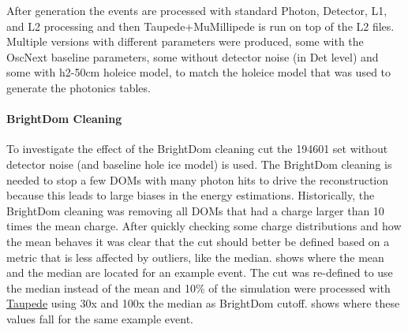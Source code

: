 After generation the events are processed with standard Photon, Detector, L1, and L2 processing and then Taupede+MuMillipede is run on top of the L2 files. Multiple versions with different parameters were produced, some with the OscNext baseline parameters, some without detector noise (in Det level) and some with h2-50cm holeice model, to match the holeice model that was used to generate the photonics tables.


\paragraph{BrightDom Cleaning}

To investigate the effect of the BrightDom cleaning cut the 194601 set without detector noise (and baseline hole ice model) is used. The BrightDom cleaning is needed to stop a few DOMs with many photon hits to drive the reconstruction because this leads to large biases in the energy estimations. Historically, the BrightDom cleaning was removing all DOMs that had a charge larger than 10 times the mean charge. After quickly checking some charge distributions and how the mean behaves it was clear that the cut should better be defined based on a metric that is less affected by outliers, like the median.  shows where the mean and the median are located for an example event. The cut was re-defined to use the median instead of the mean and 10\% of the simulation were processed with \href{https://github.com/LeanderFischer/I3_HNL_Decay/blob/a6838ec48e0a2d4f6547cbe064d2928ec55fb76d/submission_scripts/process/process_Taupede.py}{Taupede} using 30x and 100x the median as BrightDom cutoff.  shows where these values fall for the same example event.


